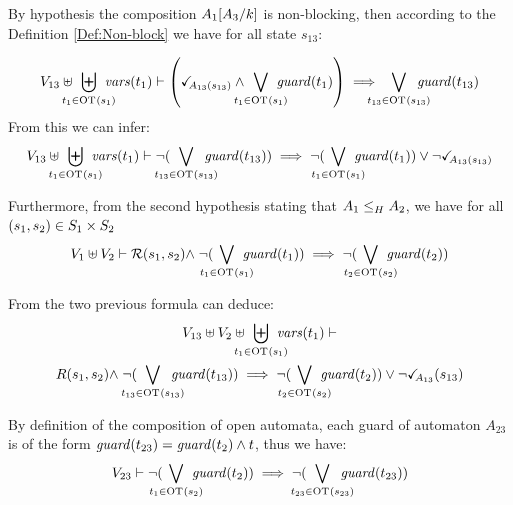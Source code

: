 \documentclass[runningheads]{llncs}
\begin{document}
\begin{enumerate}
By hypothesis  the composition  \(A_1\subst{A_3}{k}\) is non-blocking,  then according to the Definition \ref{Def:Non-block} we have for all state $s_{13}$: 


\begin{multline*}
V_{13} \uplus \biguplus_\subbox{t_1 \in \fOT{s_1}} \fvars{t_1}  \vdash  \left(\reach{A_{13}(s_{13})} \land \bigvee_\subbox{t_1 \in \fOT{s_1}} \fguard{t_1}\right) \implies \bigvee_\subbox{t_{13} \in \fOT{s_{13}}} \fguard{t_{13}}
\end{multline*}
From this we can infer:
\begin{multline*}
V_{13}  \uplus \biguplus_\subbox{t_1 \in \fOT{s_1}} \fvars{t_1} \vdash  \neg(\bigvee_\subbox{t_{13} \in \fOT{s_{13}}} \fguard{t_{13}})  \implies   \neg(\bigvee_\subbox{t_1 \in \fOT{s_1}} \fguard{t_1}) \lor 
\neg{\reach{A_{13}(s_{13})}}
\end{multline*}

Furthermore, from the second  hypothesis  stating that $\wrel{A_1}{A_2}{H}$,  we have for all  $\mpar{s_1, s_2} \in S_1 \times S_2$ 
\begin{multline*}
V_1 \uplus V_2 \vdash \mathcal{R}\mpar{s_1, s_2} \nwedge \neg (\bigvee_\subbox{t_1 \in \fOT{s_1}} \fguard{t_1}) \implies   \neg(\bigvee_\subbox{t_2 \in \fOT{s_2}} \fguard{t_2})
\end{multline*}

From the two previous formula can deduce:
\begin{multline*}
V_{13} \uplus V_2 \uplus \biguplus_\subbox{t_1 \in \fOT{s_1}} \fvars{t_1} \vdash\\ R\mpar{s_1, s_2} \nwedge \neg(\bigvee_\subbox{t_{13} \in \fOT{s_{13}}} \fguard{t_{13}})  \implies   \neg(\bigvee_\subbox{t_2 \in \fOT{s_2}} \fguard{t_2}) 
\lor \neg{\reach{A_{13}}(s_{13}) }
\end{multline*}

By definition of the composition of open automata, each guard of automaton 
 $A_{23}$ is of the form $\fguard{t_{23}} = \fguard{t_{2}}\land t$,  thus we have:
\begin{multline*}
V_{23}   \vdash \neg(\bigvee_\subbox{t_1 \in \fOT{s_2}} \fguard{t_2}) \implies \neg(\bigvee_\subbox{t_{23} \in \fOT{s_{23}}} \fguard{t_{23}})
\end{multline*}


\end{enumerate}
\end{document}
